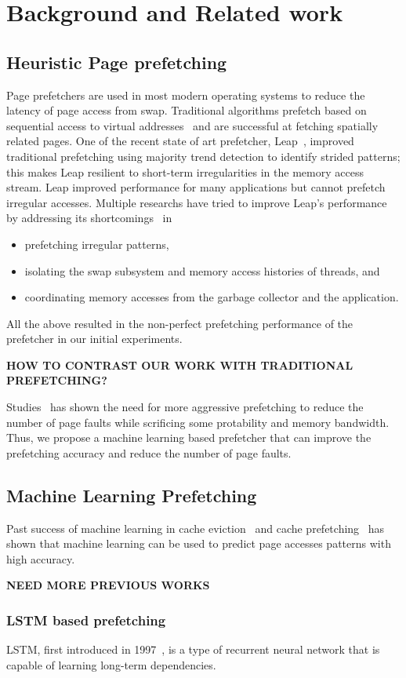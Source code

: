 \section{Background and Related work} \label{sec:2}

\subsection{Heuristic Page prefetching}
Page prefetchers are used in most modern operating systems to reduce the latency of page access from swap. 
Traditional algorithms prefetch based on sequential access to virtual addresses~\cite{vma-readahead, vm_fault_readahead} and are successful at fetching spatially related pages. 
One of the recent state of art prefetcher, Leap~\cite{leap}, improved traditional prefetching using majority trend detection to identify strided patterns; this makes Leap resilient to short-term irregularities in the memory access stream.
Leap improved performance for many applications but cannot prefetch irregular accesses. 
Multiple researchs have tried to improve Leap's performance by addressing its shortcomings~\cite{canvas, dilos, memliner} in \begin{itemize}
    \item prefetching irregular patterns,
    \item isolating the swap subsystem and memory access histories of threads, and
    \item coordinating memory accesses from the garbage collector and the application.
\end{itemize}

All the above resulted in the non-perfect prefetching performance of the prefetcher in our initial experiments.

\textbf{HOW TO CONTRAST OUR WORK WITH TRADITIONAL PREFETCHING?}

Studies~\cite{Aggressive} has shown the need for more aggressive prefetching to reduce the number of page faults while scrificing some protability and memory bandwidth. Thus, we propose a machine learning based prefetcher that can improve the prefetching accuracy and reduce the number of page faults.

\subsection{Machine Learning Prefetching}
Past success of machine learning in cache eviction~\cite{RelaxedBelady} and cache prefetching~\cite{LMAP} has shown that machine learning can be used to predict page accesses patterns with high accuracy.

\textbf{NEED MORE PREVIOUS WORKS}

\subsubsection{LSTM based prefetching}
LSTM, first introduced in 1997~\cite{LSTM}, is a type of recurrent neural network that is capable of learning long-term dependencies.